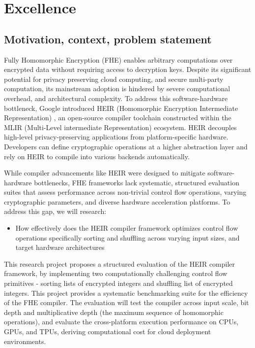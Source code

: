 
\setlength{\parindent}{0pt}
\setlength{\parskip}{1.5em}

\usetikzlibrary{shapes.geometric, arrows.meta, positioning, fit, backgrounds, calc}

\section{Excellence}

\subsection{Motivation, context, problem statement}      %
Fully Homomorphic Encryption (FHE) enables arbitrary computations over encrypted data without requiring access to decryption keys. Despite its significant potential for privacy preserving cloud computing, and secure multi-party computation, its mainstream adoption is hindered by severe computational overhead, and architectural complexity.
To address this software-hardware bottleneck, Google introduced HEIR (Homomorphic Encryption Intermediate Representation) \cite{ali2025heir}, an open-source compiler toolchain constructed within the MLIR (Multi-Level intermediate Representation) ecosystem. HEIR decouples high-level privacy-preserving applications from platform-specific hardware. Developers can define cryptographic operations at a higher abstraction layer and rely on HEIR to compile into various backends automatically.

While compiler advancements like HEIR were designed to mitigate software-hardware bottlenecks, FHE frameworks lack systematic, structured evaluation suites that assess performance across non-trivial control flow operations, varying cryptographic parameters, and diverse hardware acceleration platforms. To address this gap, we will research:
\begin{itemize}
     \item How effectively does the HEIR compiler framework optimizes control flow operations specifically sorting and shuffling across varying input sizes, and target hardware architectures
\end{itemize}

This research project proposes a structured evaluation of the HEIR compiler framework, by implementing two computationally challenging control flow primitives - sorting lists of encrypted integers and shuffling list of encrypted integers. This project provides a systematic benchmarking suite for the efficiency of the FHE compiler. The evaluation will test the compiler across input scale, bit depth and multiplicative depth (the maximum sequence of homomorphic operations), and evaluate the cross-platform execution performance on CPUs, GPUs, and TPUs, deriving computational cost for cloud deployment environments.

